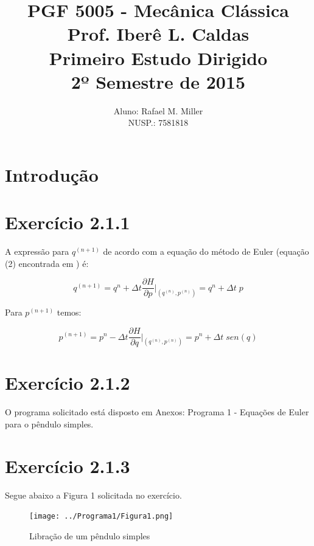 \documentclass[a4paper,10pt]{article}
\begin{document}
\title{PGF 5005 - Mecânica Clássica \\ Prof. Iberê L. Caldas \\ Primeiro Estudo Dirigido \\ 2º Semestre de 2015}

\author{Aluno: Rafael M. Miller \\ NUSP.: 7581818}

\maketitle

\section*{Introdução}

\section*{Exercício 2.1.1}

  A expressão para $q^{(n+1)}$ de acordo com a equação do método de Euler (equação (2) encontrada em \cite{estudodirigido1}) é:

  \begin{equation}
    q^{(n+1)} = q^n + \Delta t \frac{\partial H}{\partial p}\Big|_{(q^{(n)},p^{(n)})} = q^n + \Delta t \; p
  \end{equation}

  Para $p^{(n+1)}$ temos:

  \begin{equation}
    p^{(n+1)} = p^n - \Delta t \frac{\partial H}{\partial q}\Big|_{(q^{(n)},p^{(n)})} = p^n + \Delta t \; sen(q)
  \end{equation}

\section*{Exercício 2.1.2}
  O programa solicitado está disposto em Anexos: Programa 1 - Equações de Euler para o pêndulo simples.

\section*{Exercício 2.1.3}
  Segue abaixo a Figura 1 solicitada no exercício.
  \begin{figure}[H]
    \centering
    \texttt{[image: ../Programa1/Figura1.png]}
    \caption{Libração de um pêndulo simples}
  \end{figure}
\end{document}
